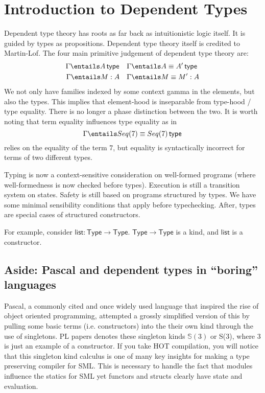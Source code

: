 \documentclass[11pt]{article}
\begin{document}
\section*{Introduction to Dependent Types}

Dependent type theory has roots as far back as intuitionistic logic itself. It is guided by types as propositions. Dependent type theory itself is credited to Martin-Lof. The four main primitive judgement of dependent type theory are:
\begin{align*}
    \Gamma \entails \isTp{A} \quad & \Gamma \entails \eqTp{A}{A'} \\
    \Gamma \entails M : A \quad & \Gamma \entails M \equiv M' : A \\
\end{align*}
We not only have families indexed by some context gamma in the elements, but also the types. This implies that element-hood is inseparable from type-hood / type equality. There is no longer a phase distinction between the two. It is worth noting that term equality influences type equality as in
$$\Gamma \entails \eqTp{Seq(7)}{Seq(7)}$$
relies on the equality of the term 7, but equality is syntactically incorrect for terms of two different types.

Typing is now a context-sensitive consideration on well-formed programs (where well-formedness is now checked before types).
Execution is still a transition system on states.
Safety is still based on programs structured by types. We have some minimal sensibility conditions that apply before typechecking. After, types are special cases of structured constructors.

For example, consider $\mathsf{list} : \mathsf{Type} \rightarrow \mathsf{Type}$.
$\mathsf{Type} \rightarrow \mathsf{Type}$ is a kind, and $\mathsf{list}$ is a constructor.

\subsection*{Aside: Pascal and dependent types in ``boring'' languages}

Pascal, a commonly cited and once widely used language that inspired the rise of object oriented programming, attempted a grossly simplified version of this by pulling some basic terms (i.e. constructors) into the their own kind through the use of singletons. PL papers denotes these singleton kinds $\mathbb{S}(3)$ or S(3), where 3 is just an example of a constructor. If you take HOT compilation, you will notice that this singleton kind calculus is one of many key insights for making a type preserving compiler for SML. This is necessary to handle the fact that modules influence the statics for SML yet functors and structs clearly have state and evaluation.
\end{document}
